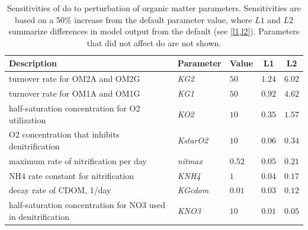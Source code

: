 \documentclass[letterpaper,12pt,oneside]{article}\usepackage[]{graphicx}\usepackage[]{color}
\begin{document}
\begin{table}[!tbp]
{\normalsize
\caption{Sensitivities of \ac{do} to perturbation of organic matter parameters.  Sensitivities are based on a 50\% increase from the default parameter value, where $L1$ and $L2$ summarize differences in model output from the default (see \cref{l1,l2}).  Parameters that did not affect \ac{do} are not shown.\label{tab:omsens}} 
\begin{center}
\begin{tabular}{lllll}
\hline\hline
\multicolumn{1}{l}{Description}&\multicolumn{1}{c}{Parameter}&\multicolumn{1}{c}{Value}&\multicolumn{1}{c}{L1}&\multicolumn{1}{c}{L2}\tabularnewline
\hline
turnover rate for OM2A and OM2G&\textit{KG2}&$50$&$1.24$&$6.02$\tabularnewline
turnover rate for OM1A and OM1G&\textit{KG1}&$50$&$0.92$&$4.62$\tabularnewline
half-saturation concentration for O2 utilization&\textit{KO2}&$10$&$0.35$&$1.57$\tabularnewline
O2 concentration that inhibits denitrification&\textit{KstarO2}&$10$&$0.06$&$0.34$\tabularnewline
maximum rate of nitrification per day&\textit{nitmax}&$0.52$&$0.05$&$0.21$\tabularnewline
NH4 rate constant for nitrification&\textit{KNH4}&$1$&$0.04$&$0.17$\tabularnewline
decay rate of CDOM, 1/day&\textit{KGcdom}&$0.01$&$0.03$&$0.12$\tabularnewline
half-saturation concentration for NO3 used in denitrification&\textit{KNO3}&$10$&$0.01$&$0.05$\tabularnewline
\hline
\end{tabular}\end{center}}

\end{table}
\end{document}
